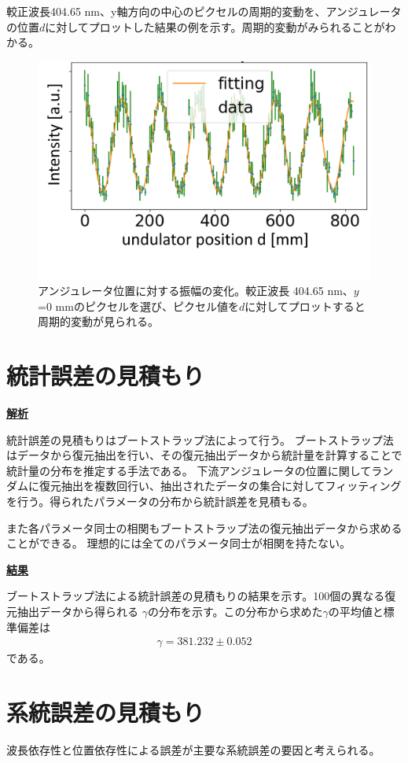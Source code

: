 \documentclass[a4paper,11pt,uplatex]{jsbook}
\begin{document}
較正波長404.65 nm、y軸方向の中心のピクセルの周期的変動を、アンジュレータの位置$d$に対してプロットした結果の例を示す。周期的変動がみられることがわかる。
\begin{figure}
  \centering
  \includegraphics[width=0.8\linewidth]{image/4-oscillation.png}
  \caption[アンジュレータ位置に対する振幅の変化]{アンジュレータ位置に対する振幅の変化。較正波長 404.65 nm、$y$ =0 mmのピクセルを選び、ピクセル値を$d$に対してプロットすると周期的変動が見られる。}
\end{figure}

\section{統計誤差の見積もり}
\noindent \textbf{\underline{解析}}\par
統計誤差の見積もりはブートストラップ法によって行う。
ブートストラップ法はデータから復元抽出を行い、その復元抽出データから統計量を計算することで統計量の分布を推定する手法である。
下流アンジュレータの位置に関してランダムに復元抽出を複数回行い、抽出されたデータの集合に対してフィッティングを行う。得られたパラメータの分布から統計誤差を見積もる。

また各パラメータ同士の相関もブートストラップ法の復元抽出データから求めることができる。
理想的には全てのパラメータ同士が相関を持たない。

\noindent \textbf{\underline{結果}}\par
ブートストラップ法による統計誤差の見積もりの結果を示す。100個の異なる復元抽出データから得られる
$\gamma$の分布を示す。この分布から求めた$\gamma$の平均値と標準偏差は
\begin{eqnarray}
  \gamma = 381.232 \pm 0.052
\end{eqnarray}
である。
\section{系統誤差の見積もり}
波長依存性と位置依存性による誤差が主要な系統誤差の要因と考えられる。
\end{document}
